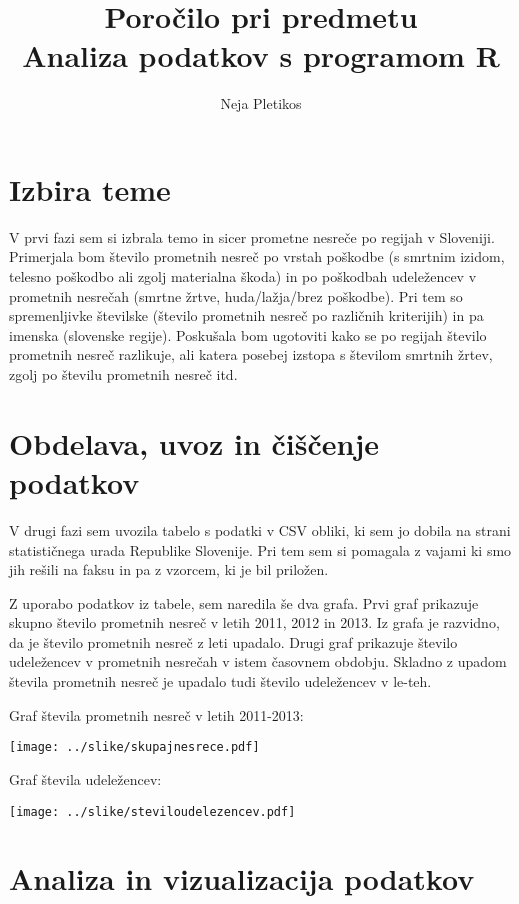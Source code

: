 \documentclass[11pt,a4paper]{article}
\begin{document}
\title{Poročilo pri predmetu \\
Analiza podatkov s programom R}
\author{Neja Pletikos}
\maketitle

\section{Izbira teme}

V prvi fazi sem si izbrala temo in sicer prometne nesreče po regijah v Sloveniji. Primerjala bom število prometnih nesreč po vrstah poškodbe (s smrtnim izidom, telesno poškodbo ali zgolj materialna škoda) in po poškodbah udeležencev v prometnih nesrečah (smrtne žrtve, huda/lažja/brez poškodbe). Pri tem so spremenljivke številske (število prometnih nesreč po različnih kriterijih) in pa imenska (slovenske regije). Poskušala bom ugotoviti kako se po regijah število prometnih nesreč razlikuje, ali katera posebej izstopa s številom smrtnih žrtev, zgolj po številu prometnih nesreč itd.

\section{Obdelava, uvoz in čiščenje podatkov}

V drugi fazi sem uvozila tabelo s podatki v CSV obliki, ki sem jo dobila na strani statističnega urada Republike Slovenije. Pri tem sem si pomagala z vajami ki smo jih rešili na faksu in pa z vzorcem, ki je bil priložen. \par
Z uporabo podatkov iz tabele, sem naredila še dva grafa. Prvi graf prikazuje skupno število prometnih nesreč v letih 2011, 2012 in 2013. Iz grafa je razvidno, da je število prometnih nesreč z leti upadalo. Drugi graf prikazuje število udeležencev v prometnih nesrečah v istem časovnem obdobju. Skladno z upadom števila prometnih nesreč je upadalo tudi število udeležencev v le-teh.

\newpage

Graf števila prometnih nesreč v letih 2011-2013:

\texttt{[image: ../slike/skupajnesrece.pdf]}

Graf števila udeležencev:

\texttt{[image: ../slike/steviloudelezencev.pdf]}

\section{Analiza in vizualizacija podatkov}
\end{document}
